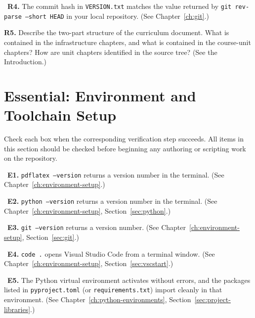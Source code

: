 \begin{Form}
\vs

\noindent\CheckBox[name=r4,width=0.4cm,height=0.4cm]{}~\textbf{R4.}
The commit hash in \texttt{VERSION.txt} matches the value returned
by \texttt{git rev-parse --short HEAD} in your local repository.
(See Chapter~\ref{ch:git}.)

\vs

\noindent\textbf{R5.} Describe the two-part structure of the
curriculum document. What is contained in the infrastructure
chapters, and what is contained in the course-unit chapters? How
are unit chapters identified in the source tree?
(See the Introduction.)\\[4pt]
\TextField[name=r5,width=\linewidth,height=3cm,multiline=true,
           bordercolor=black]{}

\section{Essential: Environment and Toolchain Setup}
\label{sec:assess-essential}

Check each box when the corresponding verification step succeeds.
All items in this section should be checked before beginning any
authoring or scripting work on the repository.

\vs

\noindent\CheckBox[name=e1,width=0.4cm,height=0.4cm]{}~\textbf{E1.}
\texttt{pdflatex --version} returns a version number in the
terminal.
(See Chapter~\ref{ch:environment-setup}.)

\vs

\noindent\CheckBox[name=e2,width=0.4cm,height=0.4cm]{}~\textbf{E2.}
\texttt{python --version} returns a version number in the terminal.
(See Chapter~\ref{ch:environment-setup}, Section~\ref{sec:python}.)

\vs

\noindent\CheckBox[name=e3,width=0.4cm,height=0.4cm]{}~\textbf{E3.}
\texttt{git --version} returns a version number.
(See Chapter~\ref{ch:environment-setup}, Section~\ref{sec:git}.)

\vs

\noindent\CheckBox[name=e4,width=0.4cm,height=0.4cm]{}~\textbf{E4.}
\texttt{code .} opens Visual Studio Code from a terminal window.
(See Chapter~\ref{ch:environment-setup}, Section~\ref{sec:vscstart}.)

\vs

\noindent\CheckBox[name=e5,width=0.4cm,height=0.4cm]{}~\textbf{E5.}
The Python virtual environment activates without errors, and the
packages listed in \texttt{pyproject.toml} (or
\texttt{requirements.txt}) import cleanly in that environment.
(See Chapter~\ref{ch:python-environments},
Section~\ref{sec:project-libraries}.)


\end{Form}
